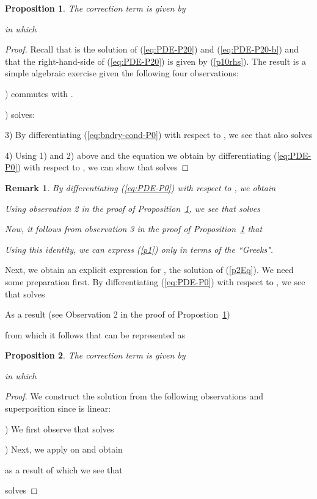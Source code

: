 \documentclass[11pt]{article}
\newtheorem{remark}{Remark}[section]
\newtheorem{prop}{Proposition}[section]
\numberwithin{equation}{section}
\begin{document}
\begin{prop}\label{prop:sec-term}
The correction term  is given by

in which

\end{prop}
\begin{proof}
Recall that  is the solution of (\ref{eq:PDE-P20}) and (\ref{eq:PDE-P20-b}) and that the right-hand-side of  (\ref{eq:PDE-P20}) is given by (\ref{p10rhs}).  
The result is a simple algebraic exercise given the following four observations:

)   commutes
with . 

) 
 solves:

3) By differentiating (\ref{eq:bndry-cond-P0}) with respect to , we see
that  also solves 

4) Using 1) and 2) above and the equation we obtain by differentiating (\ref{eq:PDE-P0}) with respect to
, we can show that
 solves

\end{proof}
\begin{remark}
By differentiating (\ref{eq:PDE-P0}) with respect to , we obtain

Using observation 2 in the proof of Proposition~\ref{prop:sec-term},
we see that 
solves

Now, it follows from observation 3 in the proof of Proposition~\ref{prop:sec-term} that

Using this identity, we can express (\ref{p1}) only in terms of the ``Greeks".
\end{remark}

Next, we obtain an explicit expression for , the solution of
 (\ref{p2Eq}). We need some preparation first. 
By differentiating (\ref{eq:PDE-P0}) with respect to , we see that  solves

As a result (see Observation 2 in the proof of Propostion~\ref{prop:sec-term})

from which it follows that  can be represented as

\begin{prop}
The correction term  is given by

in which

\end{prop}
\begin{proof}
We construct the solution from the following observations and superposition since  is linear:

)
We first observe that
 solves


) Next, we apply  on  and obtain

as a result of which we see that

solves

\end{proof}
\end{document}
